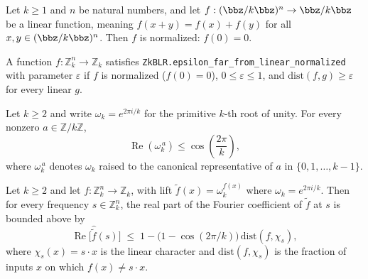 \begin{lemma}
\label{ZkBLR.linear_normalized}
\leanok
{}
Let $k \ge 1$ and $n$ be natural numbers, and let $f : (\bbz/k\bbz)^n \to \bbz/k\bbz$ be
a linear function, meaning $f(x+y) = f(x) + f(y)$ for all $x, y \in (\bbz/k\bbz)^n$.
Then $f$ is normalized: $f(0) = 0$.
\end{lemma}

\begin{definition}
\label{ZkBLR.epsilon_far_from_linear_normalized}
\leanok
{}
A function $f : \mathbb{Z}_k^n \to \mathbb{Z}_k$ satisfies
\texttt{ZkBLR.epsilon\_far\_from\_linear\_normalized} with parameter $\varepsilon$
if $f$ is normalized ($f(0)=0$), $0\le\varepsilon\le 1$, and
$\mathrm{dist}(f,g)\ge\varepsilon$ for every linear $g$.
\end{definition}

\begin{lemma}
\label{ZkBLR.re_toOmega_le_re_rootOfUnity}
\leanok
{}
Let $k \ge 2$ and write $\omega_k = e^{2\pi i / k}$ for the primitive $k$-th root of
unity. For every nonzero $a \in \mathbb{Z}/k\mathbb{Z}$,
\[
\operatorname{Re}\!\left(\omega_k^{\,a}\right) \le \cos\!\left(\frac{2\pi}{k}\right),
\]
where $\omega_k^{\,a}$ denotes $\omega_k$ raised to the canonical representative of $a$
in $\{0, 1, \ldots, k-1\}$.
\end{lemma}

\begin{lemma}
\label{ZkBLR.re_fourier_coeff_upper_bound}
\leanok
{}
Let $k \ge 2$ and let $f : \mathbb{Z}_k^n \to \mathbb{Z}_k$, with lift $\widetilde{f}(x)
= \omega_k^{f(x)}$ where $\omega_k = e^{2\pi i/k}$. Then for every frequency $s \in
\mathbb{Z}_k^n$, the real part of the Fourier coefficient of $\widetilde{f}$ at $s$ is
bounded above by
\[
  \operatorname{Re}\bigl[\widehat{\widetilde{f}}(s)\bigr]
  \;\le\;
  1 - \bigl(1 - \cos(2\pi/k)\bigr)\,\mathrm{dist}(f,\chi_s),
\]
where $\chi_s(x) = s\cdot x$ is the linear character and $\mathrm{dist}(f,\chi_s)$ is
the fraction of inputs $x$ on which $f(x) \ne s\cdot x$.
\end{lemma}

